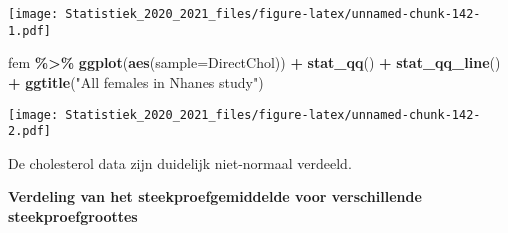 \documentclass[
  12pt,dutch,coursenotes]{book}
\newenvironment{Shaded}{\begin{snugshade}}{\end{snugshade}}
\newcommand{\DataTypeTok}[1]{\textcolor[rgb]{0.13,0.29,0.53}{#1}}
\newcommand{\KeywordTok}[1]{\textcolor[rgb]{0.13,0.29,0.53}{\textbf{#1}}}
\newcommand{\NormalTok}[1]{#1}
\newcommand{\OperatorTok}[1]{\textcolor[rgb]{0.81,0.36,0.00}{\textbf{#1}}}
\newcommand{\StringTok}[1]{\textcolor[rgb]{0.31,0.60,0.02}{#1}}
\theoremstyle{definition}
\theoremstyle{definition}
\theoremstyle{definition}
\theoremstyle{remark}
\begin{document}
\begin{Shaded}
\end{Shaded}

\texttt{[image: Statistiek\_2020\_2021\_files/figure-latex/unnamed-chunk-142-1.pdf]}

\begin{Shaded}
\begin{Highlighting}[]
\NormalTok{ fem }\OperatorTok{\%\textgreater{}\%}
\StringTok{  }\KeywordTok{ggplot}\NormalTok{(}\KeywordTok{aes}\NormalTok{(}\DataTypeTok{sample=}\NormalTok{DirectChol)) }\OperatorTok{+}
\StringTok{  }\KeywordTok{stat\_qq}\NormalTok{() }\OperatorTok{+}
\StringTok{  }\KeywordTok{stat\_qq\_line}\NormalTok{() }\OperatorTok{+}
\StringTok{  }\KeywordTok{ggtitle}\NormalTok{(}\StringTok{"All females in Nhanes study"}\NormalTok{)}
\end{Highlighting}
\end{Shaded}

\texttt{[image: Statistiek\_2020\_2021\_files/figure-latex/unnamed-chunk-142-2.pdf]}

De cholesterol data zijn duidelijk niet-normaal verdeeld.

\textbf{Verdeling van het steekproefgemiddelde voor verschillende steekproefgroottes}
\end{document}
